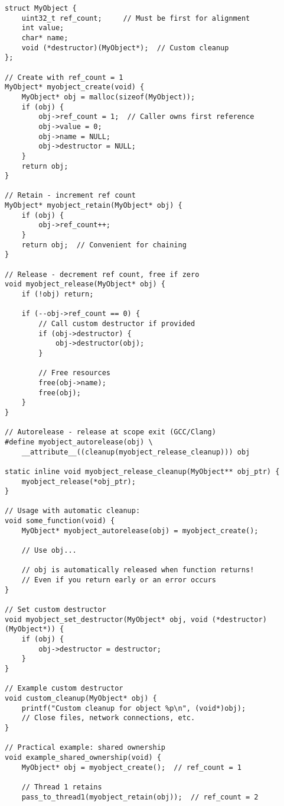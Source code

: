 \begin{lstlisting}
struct MyObject {
    uint32_t ref_count;     // Must be first for alignment
    int value;
    char* name;
    void (*destructor)(MyObject*);  // Custom cleanup
};

// Create with ref_count = 1
MyObject* myobject_create(void) {
    MyObject* obj = malloc(sizeof(MyObject));
    if (obj) {
        obj->ref_count = 1;  // Caller owns first reference
        obj->value = 0;
        obj->name = NULL;
        obj->destructor = NULL;
    }
    return obj;
}

// Retain - increment ref count
MyObject* myobject_retain(MyObject* obj) {
    if (obj) {
        obj->ref_count++;
    }
    return obj;  // Convenient for chaining
}

// Release - decrement ref count, free if zero
void myobject_release(MyObject* obj) {
    if (!obj) return;

    if (--obj->ref_count == 0) {
        // Call custom destructor if provided
        if (obj->destructor) {
            obj->destructor(obj);
        }

        // Free resources
        free(obj->name);
        free(obj);
    }
}

// Autorelease - release at scope exit (GCC/Clang)
#define myobject_autorelease(obj) \
    __attribute__((cleanup(myobject_release_cleanup))) obj

static inline void myobject_release_cleanup(MyObject** obj_ptr) {
    myobject_release(*obj_ptr);
}

// Usage with automatic cleanup:
void some_function(void) {
    MyObject* myobject_autorelease(obj) = myobject_create();

    // Use obj...

    // obj is automatically released when function returns!
    // Even if you return early or an error occurs
}

// Set custom destructor
void myobject_set_destructor(MyObject* obj, void (*destructor)(MyObject*)) {
    if (obj) {
        obj->destructor = destructor;
    }
}

// Example custom destructor
void custom_cleanup(MyObject* obj) {
    printf("Custom cleanup for object %p\n", (void*)obj);
    // Close files, network connections, etc.
}

// Practical example: shared ownership
void example_shared_ownership(void) {
    MyObject* obj = myobject_create();  // ref_count = 1

    // Thread 1 retains
    pass_to_thread1(myobject_retain(obj));  // ref_count = 2


\end{lstlisting}

